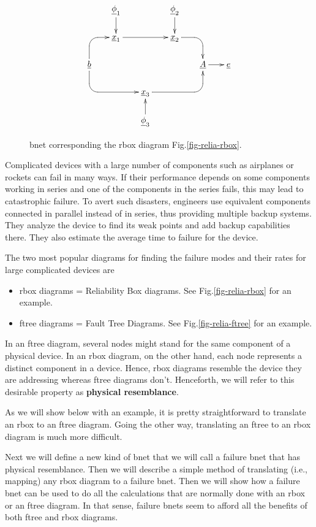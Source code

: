 \begin{figure}[h!]
\centering
$$\xymatrix@-.5pc{
&\ul{\phi}_1\ar[d]&&\ul{\phi}_2\ar[d]
\\
&\rvx_1\ar[rr]
&&
\rvx_2
\ar `r[rd][rd]
\\
\rvb\ar`u[u][ru]
\ar`d[dr][rrd]
&&&&\rvA\ar[r]&\rve
\\
&&
\rvx_3
\ar `r[rru][rru]
\\
&&\ul{\phi}_3\ar[u]
}$$
\caption{bnet corresponding
the rbox diagram 
Fig.\ref{fig-relia-rbox}.}
\label{fig-relia-bnet}
\end{figure}

Complicated devices
with a large number 
of components
such as airplanes or rockets can
fail in many
ways. If
their performance
depends 
on some components
working in series
and one 
of the components
in the series
fails, this
may lead to
catastrophic failure.
To avert
such disasters,
engineers use equivalent
components
connected in parallel
instead of in series,
thus providing multiple backup
systems. They
analyze the
device to find its 
weak points and add
backup capabilities 
there. They also
estimate the
average time to failure
for the device. 



The two 
most popular diagrams
for finding the failure modes and their rates
for large complicated devices
are
\begin{itemize}
\item
rbox diagrams = Reliability Box diagrams. 
See Fig.\ref{fig-relia-rbox} for an example.
\item
ftree diagrams = Fault Tree Diagrams.
See Fig.\ref{fig-relia-ftree} for an example.
\end{itemize}
In an ftree diagram,
several nodes might
stand for the same 
component of a physical device.
In an rbox diagram,
on the
other hand, 
each node
represents a distinct  component
in a device. Hence, rbox diagrams
resemble the device they are
addressing
whereas ftree diagrams don't.
Henceforth, we will
refer to this desirable property
as {\bf  physical resemblance}.

As we will
show below with an example,
it is pretty
straightforward
to translate
an rbox to  an ftree diagram.
Going the other
way, translating
an ftree to an rbox diagram
is much more difficult.



Next we will define
a new kind of bnet
that we will call a failure bnet
that has physical resemblance.
Then we will describe
a simple method of translating (i.e., mapping)
any rbox diagram to a failure bnet.
Then we will show
how a failure
bnet can be used
to do all the
calculations
that are normally
done with an rbox
or an ftree diagram.
In that sense,
failure bnets
seem to afford
all the benefits
of both ftree and rbox 
diagrams.


